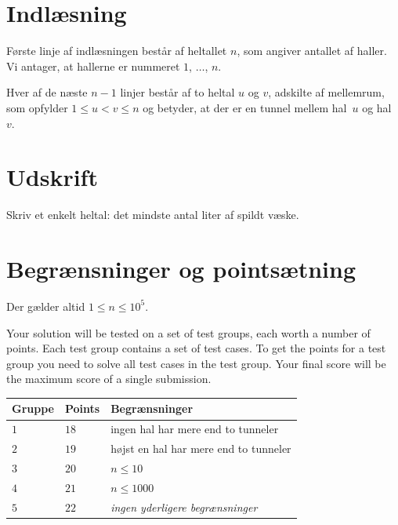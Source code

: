 \section*{Indlæsning}

Første linje af indlæsningen består af heltallet $n$, som angiver antallet af haller.
Vi antager, at hallerne er nummeret $1$, $\ldots$, $n$.

Hver af de næste $n-1$ linjer består af to heltal $u$ og $v$, adskilte af mellemrum, som opfylder
$1\leq u < v \leq n$ %
og betyder, at der er en tunnel mellem hal~$u$ og hal~$v$.

\section*{Udskrift}

Skriv et enkelt heltal: det mindste antal liter af spildt væske.

\section*{Begrænsninger og pointsætning}

Der gælder altid
$1\leq n\leq 10^5$. %

Your solution will be tested on a set of test groups, each worth a number of points.
Each test group contains a set of test cases.
To get the points for a test group you need to solve all test cases in the test group.
Your final score will be the maximum score of a single submission.

\medskip
\begin{tabular}{lll}
  Gruppe & Points & Begrænsninger \\\hline
  $1$ & $18$ & ingen hal har mere end to tunneler\\
  $2$ & $19$ & højst en hal har mere end to tunneler\\
  $3$ & $20$ & $n\leq 10$\\
  $4$ & $21$ & $n\leq 1000$\\
  $5$ & $22$ & \emph{ingen yderligere begrænsninger}
\end{tabular}
